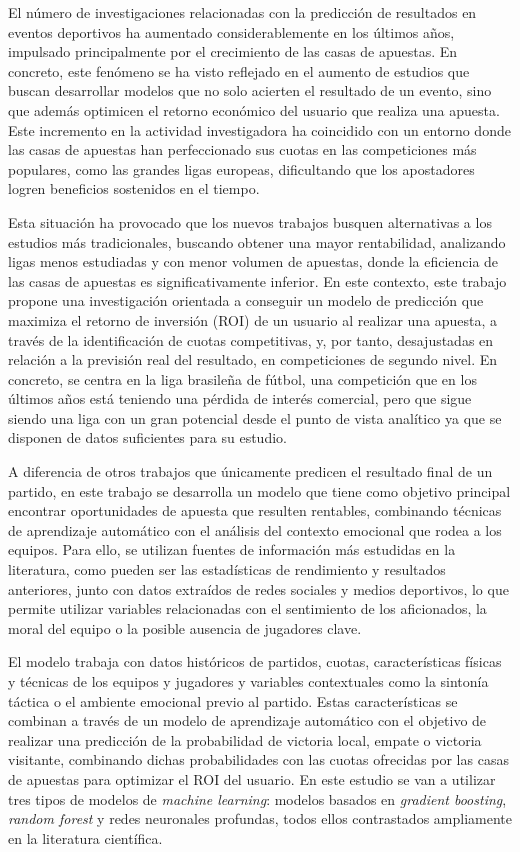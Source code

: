 El número de investigaciones relacionadas con la predicción de resultados en eventos deportivos ha aumentado considerablemente en los últimos años, impulsado principalmente por el crecimiento de las casas de apuestas. En concreto, este fenómeno se ha visto reflejado en el aumento de estudios que buscan desarrollar modelos que no solo acierten el resultado de un evento, sino que además optimicen el retorno económico del usuario que realiza una apuesta. Este incremento en la actividad investigadora ha coincidido con un entorno donde las casas de apuestas han perfeccionado sus cuotas en las competiciones más populares, como las grandes ligas europeas, dificultando que los apostadores logren beneficios sostenidos en el tiempo.

Esta situación ha provocado que los nuevos trabajos busquen alternativas a los estudios más tradicionales, buscando obtener una mayor rentabilidad, analizando ligas menos estudiadas y con menor volumen de apuestas, donde la eficiencia de las casas de apuestas es significativamente inferior. En este contexto, este trabajo propone una investigación orientada a conseguir un modelo de predicción que maximiza el retorno de inversión (ROI) de un usuario al realizar una apuesta, a través de la identificación de cuotas competitivas, y, por tanto, desajustadas en relación a la previsión real del resultado, en competiciones de segundo nivel. En concreto, se centra en la liga brasileña de fútbol, una competición que en los últimos años está teniendo una pérdida de interés comercial, pero que sigue siendo una liga con un gran potencial desde el punto de vista analítico ya que se disponen de datos suficientes para su estudio.

A diferencia de otros trabajos que únicamente predicen el resultado final de un partido, en este trabajo se desarrolla un modelo que tiene como objetivo principal encontrar oportunidades de apuesta que resulten rentables, combinando técnicas de aprendizaje automático con el análisis del contexto emocional que rodea a los equipos. Para ello, se utilizan fuentes de información más estudidas en la literatura, como pueden ser las estadísticas de rendimiento y resultados anteriores, junto con datos extraídos de redes sociales y medios deportivos, lo que permite utilizar variables relacionadas con el sentimiento de los aficionados, la moral del equipo o la posible ausencia de jugadores clave.

El modelo trabaja con datos históricos de partidos, cuotas, características físicas y técnicas de los equipos y jugadores y variables contextuales como la sintonía táctica o el ambiente emocional previo al partido. Estas características se combinan a través de un modelo de aprendizaje automático con el objetivo de realizar una predicción de la probabilidad de victoria local, empate o victoria visitante, combinando dichas probabilidades con las cuotas ofrecidas por las casas de apuestas para optimizar el ROI del usuario. En este estudio se van a utilizar tres tipos de modelos de \textit{machine learning}: modelos basados en \textit{gradient boosting}, \textit{random forest} y redes neuronales profundas, todos ellos contrastados ampliamente en la literatura científica.


